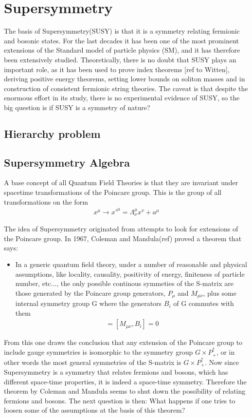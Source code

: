 \section{Supersymmetry}
The basis of Supersymmetry(SUSY) is that it is a symmetry relating fermionic and bosonic states. For the last decades it has been one of the most prominent extensions of the Standard model of particle physics (SM), and it has therefore been extensively studied. Theoretically, there is no doubt that SUSY plays an important role, as it has been used to prove index theorems [ref to Witten], deriving positive energy theorems, setting lower bounds on soliton masses and in construction of consistent fermionic string theories. The caveat is that despite the enormous effort in its study, there is no experimental evidence of SUSY, so the big question is if SUSY is a symmetry of nature?

\subsection{Hierarchy problem}

\subsection{Supersymmetry Algebra}
A base concept of all Quantum Field Theories is that they are invariant under spacetime transformations of the Poincare group. This is the group of all transformations on the form
\begin{align}
    x^{\mu}\rightarrow x'^{\mu}=\Lambda^{\mu}_{\nu}x^{\nu}+a^{\mu}
\end{align}

\medskip
The idea of Supersymmetry originated from attempts to look for extensions of the Poincare group. In 1967, Coleman and Mandula(ref) proved a theorem that says:
\begin{itemize}
    \item In a generic quantum field theory, under a number of reasonable and physical assumptions, like locality, causality, positivity of energy, finiteness of particle number, etc..., the only possible continous symmeties of the S-matrix are those generated by the Poincare group generators, $P_{\mu}$ and $M_{\mu\nu}$, plus some internal symmetry group G where the generators $B_{i}$ of G commutes with them
    \begin{align*}
        [P_{\mu},B_{i}]=[M_{\mu\nu},B_{i}]=0
    \end{align*}
\end{itemize}
From this one draws the conclusion that any extension of the Poincare group to include gauge symmetries is isomorphic to the symmetry group $G\times P^{\uparrow}_{+}$, or in other words the most general symmetries of the S-matrix is $G\times P^{\uparrow}_{+}$. Now since Supersymmetry is a symmetry that relates fermions and bosons, which has different space-time properties, it is indeed a space-time symmetry. Therefore the theorem by Coleman and Mandula seems to shut down the possibility of relating fermions and bosons. The next question is then: What happens if one tries to loosen some of the assumptions at the basis of this theorem?


